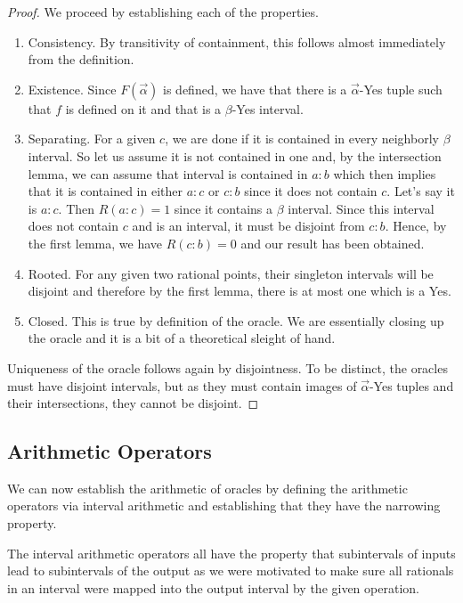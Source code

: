 \documentclass[12pt]{article}
\theoremstyle{remark}
\begin{document}
\begin{proof}
We proceed by establishing each of the properties. 

\begin{enumerate}
    \item Consistency. By transitivity of containment, this follows almost immediately from the definition. 
    \item Existence. Since $F(\vec{\alpha})$ is defined, we have that there is a $\vec{\alpha}$-Yes tuple such that $f$ is defined on it and that is a $\beta$-Yes interval.
    \item Separating. For a given $c$, we are done if it is contained in every neighborly $\beta$ interval. So let us assume it is not contained in one and, by the intersection lemma, we can assume that interval is contained in $a:b$ which then implies that it is contained in either $a:c$ or $c:b$ since it does not contain $c$. Let's say it is $a:c$. Then $R(a:c)=1$ since it contains a $\beta$ interval. Since this interval does not contain $c$ and is an interval, it must be disjoint from $c:b$. Hence, by the first lemma, we have $R(c:b)=0$ and our result has been obtained.
    \item Rooted. For any given two rational points, their singleton intervals will be disjoint and therefore by the first lemma, there is at most one which is a Yes. 
    \item Closed. This is true by definition of the oracle. We are essentially closing up the oracle and it is a bit of a theoretical sleight of hand.
\end{enumerate}

Uniqueness of the oracle follows again by disjointness. To be distinct, the oracles must have disjoint intervals, but  as they must contain images of $\vec{\alpha}$-Yes tuples and their intersections, they cannot be disjoint. 

\end{proof}



\subsection{Arithmetic Operators}

We can now establish the arithmetic of oracles by defining the arithmetic operators via interval arithmetic and establishing that they have the narrowing property.

The interval arithmetic operators all have the property that subintervals of inputs lead to subintervals of the output as we were motivated to make sure all rationals in an interval were mapped into the output interval by the given operation. 
\end{document}
